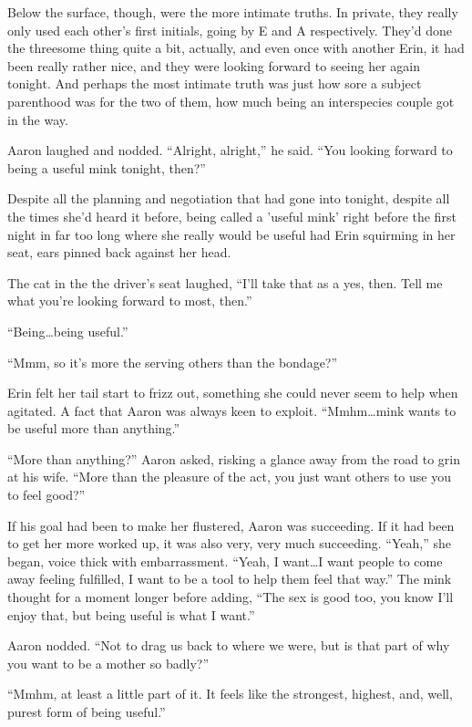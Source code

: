 Below the surface, though, were the more intimate truths. In private, they really only used each other's first initials, going by E and A respectively. They'd done the threesome thing quite a bit, actually, and even once with another Erin, it had been really rather nice, and they were looking forward to seeing her again tonight. And perhaps the most intimate truth was just how sore a subject parenthood was for the two of them, how much being an interspecies couple got in the way.

Aaron laughed and nodded. ``Alright, alright,'' he said. ``You looking forward to being a useful mink tonight, then?''

Despite all the planning and negotiation that had gone into tonight, despite all the times she'd heard it before, being called a 'useful mink' right before the first night in far too long where she really would be useful had Erin squirming in her seat, ears pinned back against her head.

The cat in the the driver's seat laughed, ``I'll take that as a yes, then. Tell me what you're looking forward to most, then.''

``Being\ldots{}being useful.''

``Mmm, so it's more the serving others than the bondage?''

Erin felt her tail start to frizz out, something she could never seem to help when agitated. A fact that Aaron was always keen to exploit. ``Mmhm\ldots{}mink wants to be useful more than anything.''

``More than anything?'' Aaron asked, risking a glance away from the road to grin at his wife. ``More than the pleasure of the act, you just want others to use you to feel good?''

If his goal had been to make her flustered, Aaron was succeeding. If it had been to get her more worked up, it was also very, very much succeeding. ``Yeah,'' she began, voice thick with embarrassment. ``Yeah, I want\ldots{}I want people to come away feeling fulfilled, I want to be a tool to help them feel that way.'' The mink thought for a moment longer before adding, ``The sex is good too, you know I'll enjoy that, but being useful is what I want.''

Aaron nodded. ``Not to drag us back to where we were, but is that part of why you want to be a mother so badly?''

``Mmhm, at least a little part of it. It feels like the strongest, highest, and, well, purest form of being useful.''

